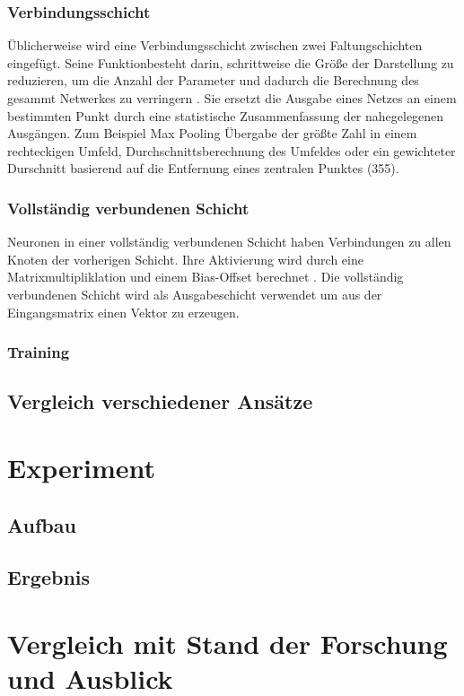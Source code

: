 \documentclass[twosided,a4,10pt]{article}
\begin{document}
\begin{multicols}{2}
\subsubsection*{Verbindungsschicht}
Üblicherweise wird eine Verbindungsschicht zwischen zwei Faltungschichten eingefügt. Seine Funktionbesteht darin, schrittweise die Größe der Darstellung zu reduzieren, um die Anzahl der Parameter und dadurch die Berechnung des gesammt Netwerkes zu verringern \cite{karpathy}. Sie ersetzt die Ausgabe eines Netzes an einem bestimmten Punkt durch eine statistische Zusammenfassung der nahegelegenen Ausgängen. Zum Beispiel Max Pooling \cite{zhou} Übergabe der größte Zahl in einem rechteckigen Umfeld, Durchschnittsberechnung des Umfeldes oder ein gewichteter Durschnitt basierend auf die Entfernung eines zentralen Punktes \cite{goodfellow}(355).

\subsubsection*{Vollständig verbundenen Schicht}
Neuronen in einer vollständig verbundenen Schicht haben Verbindungen zu allen Knoten der vorherigen Schicht. Ihre Aktivierung wird durch eine Matrixmultipliklation und einem Bias-Offset berechnet \cite{karpathy}. Die vollständig verbundenen Schicht wird als Ausgabeschicht verwendet um aus der Eingangsmatrix einen Vektor zu erzeugen.

\subsubsection*{Training}

\subsection{Vergleich verschiedener Ansätze}

\section{Experiment}

\subsection{Aufbau}

\subsection{Ergebnis}

\section{Vergleich mit Stand der Forschung und Ausblick}

%



\end{multicols}
\end{document}
